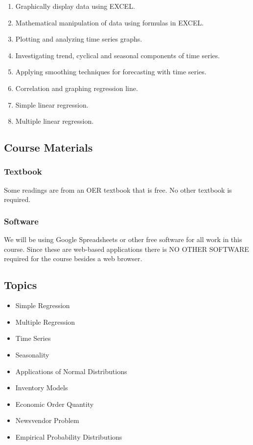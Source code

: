 \documentclass[
  letterpaper,
  DIV=11,
  numbers=noendperiod]{scrartcl}
\providecommand{\tightlist}{%
  \setlength{\itemsep}{0pt}\setlength{\parskip}{0pt}}
\begin{document}
\begin{enumerate}
\def\labelenumi{\arabic{enumi}.}
\tightlist
\item
  Graphically display data using EXCEL.
\item
  Mathematical manipulation of data using formulas in EXCEL.
\item
  Plotting and analyzing time series graphs.
\item
  Investigating trend, cyclical and seasonal components of time series.
\item
  Applying smoothing techniques for forecasting with time series.
\item
  Correlation and graphing regression line.
\item
  Simple linear regression.
\item
  Multiple linear regression.
\end{enumerate}

\subsection{Course Materials}\label{course-materials}

\subsubsection{Textbook}\label{textbook}

Some readings are from an OER textbook that is free. No other textbook
is required.

\subsubsection{Software}\label{software}

We will be using Google Spreadsheets or other free software for all work
in this course. Since these are web-based applications there is NO OTHER
SOFTWARE required for the course besides a web browser.

\subsection{Topics}\label{topics}

\begin{itemize}
\tightlist
\item
  Simple Regression
\item
  Multiple Regression
\item
  Time Series
\item
  Seasonality
\item
  Applications of Normal Distributions
\item
  Inventory Models
\item
  Economic Order Quantity
\item
  Newsvendor Problem
\item
  Empirical Probability Distributions
\end{itemize}
\end{document}
